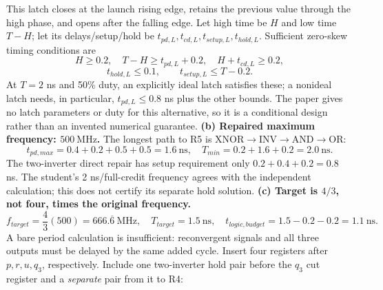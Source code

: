\documentclass[10pt]{article}
\begin{document}
\begin{center}
\end{center}
This latch closes at the launch rising edge, retains the previous value through the high phase, and opens after the falling edge. Let high time be $H$ and low time $T-H$; let its delays/setup/hold be $t_{pd,L},t_{cd,L},t_{setup,L},t_{hold,L}$. Sufficient zero-skew timing conditions are
\[H\ge0.2,\quad T-H\ge t_{pd,L}+0.2,\quad H+t_{cd,L}\ge0.2,\]
\[t_{hold,L}\le0.1,\qquad t_{setup,L}\le T-0.2.\]
At $T=2$ ns and 50\% duty, an explicitly ideal latch satisfies these; a nonideal latch needs, in particular, $t_{pd,L}\le0.8$ ns plus the other bounds. The paper gives no latch parameters or duty for this alternative, so it is a conditional design rather than an invented numerical guarantee.
\textbf{(b) Repaired maximum frequency: $\boxed{500\ \mathrm{MHz}}$.}
The longest path to R5 is XNOR$\to$INV$\to$AND$\to$OR:
\[t_{pd,max}=0.4+0.2+0.5+0.5=1.6\ \mathrm{ns},\quad T_{min}=0.2+1.6+0.2=2.0\ \mathrm{ns}.\]
The two-inverter direct repair has setup requirement only $0.2+0.4+0.2=0.8$ ns. The student's 2 ns/full-credit frequency agrees with the independent calculation; this does not certify its separate hold solution.
\textbf{(c) Target is $4/3$, not four, times the original frequency.}
\[f_{target}=\frac43(500)=666.\overline6\ \mathrm{MHz},\quad T_{target}=1.5\ \mathrm{ns},\quad t_{logic,budget}=1.5-0.2-0.2=1.1\ \mathrm{ns}.\]
A bare period calculation is insufficient: reconvergent signals and all three outputs must be delayed by the same added cycle.
\newpage
Insert four registers after $p,r,u,q_3$, respectively. Include one two-inverter hold pair before the $q_3$ cut register and a \emph{separate} pair from it to R4:
\end{document}
